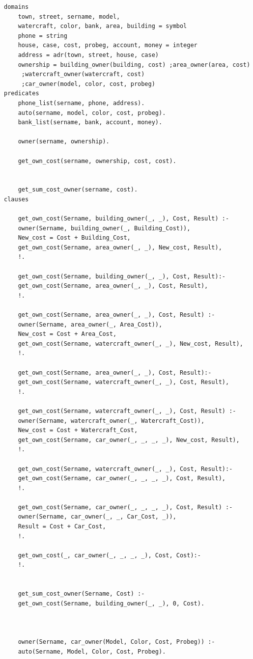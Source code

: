 \documentclass[a4paper,12pt]{article}
\begin{document}
	\begin{verbatim}
domains
	town, street, sername, model, 
	watercraft, color, bank, area, building = symbol
	phone = string
	house, case, cost, probeg, account, money = integer
	address = adr(town, street, house, case)
	ownership = building_owner(building, cost) ;area_owner(area, cost)
	 ;watercraft_owner(watercraft, cost)
	 ;car_owner(model, color, cost, probeg)
predicates
	phone_list(sername, phone, address).
	auto(sername, model, color, cost, probeg).
	bank_list(sername, bank, account, money).
	
	owner(sername, ownership).
	
	get_own_cost(sername, ownership, cost, cost).
	
	
	get_sum_cost_owner(sername, cost).
clauses

	get_own_cost(Sername, building_owner(_, _), Cost, Result) :-
	owner(Sername, building_owner(_, Building_Cost)),
	New_cost = Cost + Building_Cost,
	get_own_cost(Sername, area_owner(_, _), New_cost, Result),
	!.
	
	get_own_cost(Sername, building_owner(_, _), Cost, Result):-
	get_own_cost(Sername, area_owner(_, _), Cost, Result),
	!.
	
	get_own_cost(Sername, area_owner(_, _), Cost, Result) :-
	owner(Sername, area_owner(_, Area_Cost)),
	New_cost = Cost + Area_Cost,
	get_own_cost(Sername, watercraft_owner(_, _), New_cost, Result),
	!.
	
	get_own_cost(Sername, area_owner(_, _), Cost, Result):-
	get_own_cost(Sername, watercraft_owner(_, _), Cost, Result),
	!.
	
	get_own_cost(Sername, watercraft_owner(_, _), Cost, Result) :-
	owner(Sername, watercraft_owner(_, Watercraft_Cost)),
	New_cost = Cost + Watercraft_Cost,
	get_own_cost(Sername, car_owner(_, _, _, _), New_cost, Result),
	!.
	
	get_own_cost(Sername, watercraft_owner(_, _), Cost, Result):-
	get_own_cost(Sername, car_owner(_, _, _, _), Cost, Result),
	!.
	
	get_own_cost(Sername, car_owner(_, _, _, _), Cost, Result) :-
	owner(Sername, car_owner(_, _, Car_Cost, _)),
	Result = Cost + Car_Cost,
	!.
	
	get_own_cost(_, car_owner(_, _, _, _), Cost, Cost):-
	!.
	
	
	get_sum_cost_owner(Sername, Cost) :-
	get_own_cost(Sername, building_owner(_, _), 0, Cost).
	
	
	
	owner(Sername, car_owner(Model, Color, Cost, Probeg)) :-
	auto(Sername, Model, Color, Cost, Probeg).
	

\end{verbatim}
\end{document}
